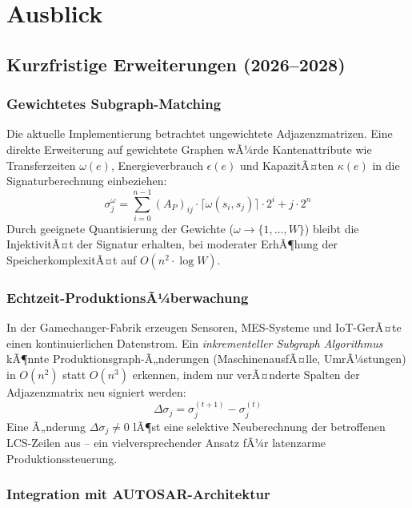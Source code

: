 ﻿\documentclass[a4paper,12pt]{article}
\theoremstyle{definition}
\begin{document}
\section{Ausblick}

\subsection{Kurzfristige Erweiterungen (2026--2028)}

\subsubsection{Gewichtetes Subgraph-Matching}

Die aktuelle Implementierung betrachtet ungewichtete Adjazenzmatrizen. Eine direkte
Erweiterung auf gewichtete Graphen \cite{zager2008graphsimilarity} wÃ¼rde Kantenattribute
wie Transferzeiten $\omega(e)$, Energieverbrauch $\epsilon(e)$ und KapazitÃ¤ten $\kappa(e)$
in die Signaturberechnung einbeziehen:
\[
\sigma_j^{\omega} = \sum_{i=0}^{n-1} (A_P)_{ij} \cdot \lceil \omega(s_i, s_j) \rceil \cdot 2^i + j \cdot 2^n
\]
Durch geeignete Quantisierung der Gewichte ($\omega \to \{1,\ldots,W\}$) bleibt die
InjektivitÃ¤t der Signatur erhalten, bei moderater ErhÃ¶hung der SpeicherkomplexitÃ¤t
auf $O(n^2 \cdot \log W)$.

\subsubsection{Echtzeit-ProduktionsÃ¼berwachung}

In der Gamechanger-Fabrik erzeugen Sensoren, MES-Systeme und IoT-GerÃ¤te einen
kontinuierlichen Datenstrom. Ein \emph{inkrementeller Subgraph Algorithmus} kÃ¶nnte
Produktionsgraph-Ã„nderungen (MaschinenausfÃ¤lle, UmrÃ¼stungen) in $O(n^2)$ statt $O(n^3)$
erkennen, indem nur verÃ¤nderte Spalten der Adjazenzmatrix neu signiert werden:
\[
\Delta\sigma_j = \sigma_j^{(t+1)} - \sigma_j^{(t)}
\]
Eine Ã„nderung $\Delta\sigma_j \neq 0$ lÃ¶st eine selektive Neuberechnung der betroffenen
LCS-Zeilen aus -- ein vielversprechender Ansatz fÃ¼r latenzarme Produktionssteuerung.

\subsubsection{Integration mit AUTOSAR-Architektur}
\end{document}
